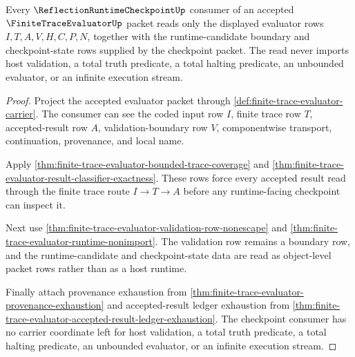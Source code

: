 \begin{theorem}
\label{thm:finite-trace-evaluator-runtime-checkpoint-boundary}
Every $\ReflectionRuntimeCheckpointUp$ consumer of an accepted
$\FiniteTraceEvaluatorUp$ packet reads only the displayed evaluator rows
$I,T,A,V,H,C,P,N$, together with the runtime-candidate boundary and
checkpoint-state rows supplied by the checkpoint packet. The read never imports
host validation, a total truth predicate, a total halting predicate, an
unbounded evaluator, or an infinite execution stream.
\end{theorem}
\begin{proof}
Project the accepted evaluator packet through
\autoref{def:finite-trace-evaluator-carrier}. The consumer can see the coded
input row $I$, finite trace row $T$, accepted-result row $A$,
validation-boundary row $V$, componentwise transport, continuation,
provenance, and local name.

Apply \autoref{thm:finite-trace-evaluator-bounded-trace-coverage} and
\autoref{thm:finite-trace-evaluator-result-classifier-exactness}. These rows
force every accepted result read through the finite trace route $I \to T \to A$
before any runtime-facing checkpoint can inspect it.

Next use \autoref{thm:finite-trace-evaluator-validation-row-nonescape} and
\autoref{thm:finite-trace-evaluator-runtime-nonimport}. The validation row
remains a boundary row, and the runtime-candidate and checkpoint-state data are
read as object-level packet rows rather than as a host runtime.

Finally attach provenance exhaustion from
\autoref{thm:finite-trace-evaluator-provenance-exhaustion} and accepted-result
ledger exhaustion from
\autoref{thm:finite-trace-evaluator-accepted-result-ledger-exhaustion}. The
checkpoint consumer has no carrier coordinate left for host validation, a total
truth predicate, a total halting predicate, an unbounded evaluator, or an
infinite execution stream.
\end{proof}

